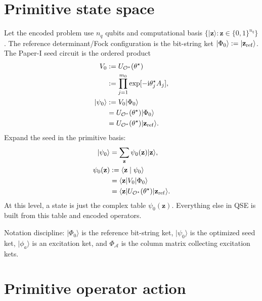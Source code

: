 \documentclass[10pt,twocolumn]{article}
\newcommand{\Oset}{\mathcal O}
\newcommand{\Acal}{\mathcal A}
\newcommand{\ii}{\mathrm i}
\newcommand{\ket}[1]{\lvert #1\rangle}
\newcommand{\bra}[1]{\langle #1\rvert}
\newcommand{\braket}[2]{\langle #1\mid #2\rangle}
\begin{document}
\section{Primitive state space}

Let the encoded problem use \(n_q\) qubits and computational basis \(\{\ket{\mathbf z}:\mathbf z\in\{0,1\}^{n_q}\}\). The reference determinant/Fock configuration is the bit-string ket \(\ket{\Phi_0}:=\ket{\mathbf z_{\rm ref}}\). The Paper-I seed circuit is the ordered product
\begin{equation}
\begin{aligned}
V_0
&:=U_{\Oset^\star}(\theta^\star)\\
&:=\prod_{j=1}^{m_0}\exp[-\ii\theta_j^\star A_j],\\
\ket{\psi_0}
&:=V_0\ket{\Phi_0}\\
&=U_{\Oset^\star}(\theta^\star)\ket{\Phi_0}\\
&=U_{\Oset^\star}(\theta^\star)\ket{\mathbf z_{\rm ref}}.
\end{aligned}
\label{eq:seed_unitary}
\end{equation}
Expand the seed in the primitive basis:
\begin{equation}
\begin{aligned}
\ket{\psi_0}
&=\sum_{\mathbf z}\psi_0(\mathbf z)\ket{\mathbf z},\\
\psi_0(\mathbf z)
&:=\braket{\mathbf z}{\psi_0}\\
&=\bra{\mathbf z}V_0\ket{\Phi_0}\\
&=\bra{\mathbf z}U_{\Oset^\star}(\theta^\star)
\ket{\mathbf z_{\rm ref}}.
\end{aligned}
\label{eq:seed_bit_amplitudes}
\end{equation}
At this level, a state is just the complex table \(\psi_0(\mathbf z)\). Everything else in QSE is built from this table and encoded operators.

\begin{jargonbox}
Notation discipline: \(\ket{\Phi_0}\) is the reference bit-string ket, \(\ket{\psi_0}\) is the optimized seed ket, \(\ket{\phi_a}\) is an excitation ket, and \(\Phi_\Acal\) is the column matrix collecting excitation kets.
\end{jargonbox}

\section{Primitive operator action}
\end{document}
